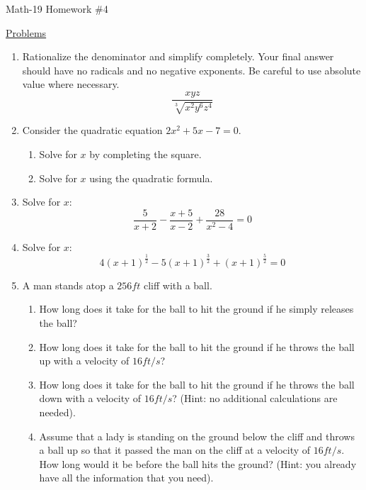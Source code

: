\documentclass[letterpaper,12pt,fleqn]{article}
\begin{document}
\begin{center}
\Large Math-19 Homework \#4
\end{center}

\vspace{0.5in}

\underline{Problems}

\begin{enumerate}
\item Rationalize the denominator and simplify completely. Your final answer
  should have no radicals and no negative exponents. Be careful to use absolute
  value where necessary.
  \[\frac{xyz}{\sqrt[3]{x^2y^6z^4}}\]
  
\item Consider the quadratic equation $2x^2+5x-7=0$.
  \begin{enumerate}
  \item Solve for $x$ by completing the square.
  \item Solve for $x$ using the quadratic formula.
  \end{enumerate}

\item Solve for $x$:
  \[\frac{5}{x+2}-\frac{x+5}{x-2}+\frac{28}{x^2-4}=0\]

\item Solve for $x$:
  \[4(x+1)^{\frac{1}{2}}-5(x+1)^{\frac{3}{2}}+(x+1)^{\frac{5}{2}}=0\]

\item A man stands atop a $256ft$ cliff with a  ball.
  \begin{enumerate}
  \item How long does it take for the ball to hit the ground if he simply
    releases the ball?

  \item How long does it take for the ball to hit the ground if he throws the
    ball up with a velocity of $16 ft/s$?

  \item How long does it take for the ball to hit the ground if he throws the
    ball down with a velocity of $16 ft/s$? (Hint: no additional calculations
    are
    needed).

  \item Assume that a lady is standing on the ground below the cliff and throws
    a ball up so that it passed the man on the cliff at a velocity of $16 ft/s$.
    How long would it be before the ball hits the ground? (Hint: you already
    have all the information that you need).
  \end{enumerate}
\end{enumerate}
\end{document}
